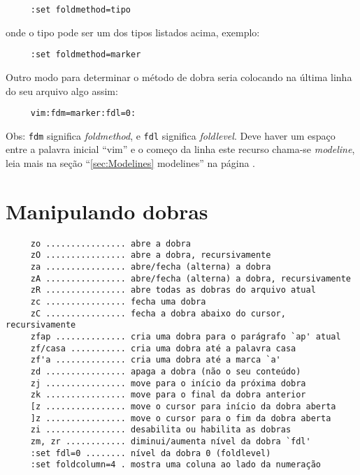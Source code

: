 \begin{verbatim}
     :set foldmethod=tipo
\end{verbatim}

onde o tipo pode ser um dos tipos listados acima, exemplo:

\begin{verbatim}
     :set foldmethod=marker
\end{verbatim}

Outro modo para determinar o método de dobra seria colocando na última
linha do seu arquivo algo assim:

\begin{verbatim}
     vim:fdm=marker:fdl=0:
\end{verbatim}

Obs: \verb|fdm| significa {\em foldmethod}, e \verb|fdl| significa
{\em foldlevel}. Deve haver um espaço entre a palavra inicial ``vim'' e o
começo da linha este recurso chama-se {\em modeline}, leia mais na seção
``\ref{sec:Modelines} modelines'' na página \pageref{sec:Modelines}.

\section{Manipulando dobras }
\label{Manipulando dobras }

\begin{verbatim}
     zo ................ abre a dobra
     zO ................ abre a dobra, recursivamente
     za ................ abre/fecha (alterna) a dobra
     zA ................ abre/fecha (alterna) a dobra, recursivamente
     zR ................ abre todas as dobras do arquivo atual
     zc ................ fecha uma dobra
     zC ................ fecha a dobra abaixo do cursor, recursivamente
     zfap .............. cria uma dobra para o parágrafo `ap' atual
     zf/casa ........... cria uma dobra até a palavra casa
     zf'a .............. cria uma dobra até a marca `a'
     zd ................ apaga a dobra (não o seu conteúdo)
     zj ................ move para o início da próxima dobra
     zk ................ move para o final da dobra anterior
     [z ................ move o cursor para início da dobra aberta
     ]z ................ move o cursor para o fim da dobra aberta
     zi ................ desabilita ou habilita as dobras
     zm, zr ............ diminui/aumenta nível da dobra `fdl'
     :set fdl=0 ........ nível da dobra 0 (foldlevel)
     :set foldcolumn=4 . mostra uma coluna ao lado da numeração
\end{verbatim}

